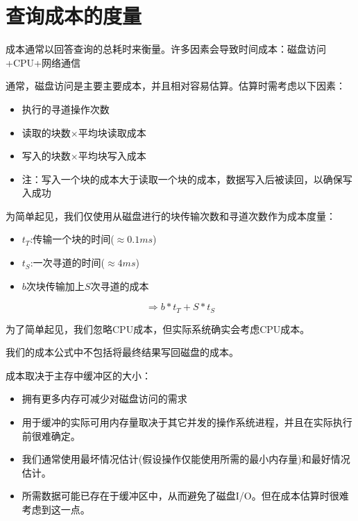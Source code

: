 \section{查询成本的度量}

成本通常以回答查询的总耗时来衡量。许多因素会导致时间成本：磁盘访问+CPU+网络通信

通常，磁盘访问是主要主要成本，并且相对容易估算。估算时需考虑以下因素：

\begin{itemize}
    \item 执行的寻道操作次数
    \item 读取的块数$\times$平均块读取成本
    \item 写入的块数$\times$平均块写入成本
    \item 注：写入一个块的成本大于读取一个块的成本，数据写入后被读回，以确保写入成功
\end{itemize}

为简单起见，我们仅使用从磁盘进行的块传输次数和寻道次数作为成本度量：

\begin{itemize}
    \item $t_T$:传输一个块的时间($\approx 0.1ms$)
    \item $t_S$:一次寻道的时间($\approx 4ms$)
    \item $b$次块传输加上$S$次寻道的成本
\end{itemize}
$$\Longrightarrow b*t_T+S*t_S$$

为了简单起见，我们忽略CPU成本，但实际系统确实会考虑CPU成本。

我们的成本公式中不包括将最终结果写回磁盘的成本。

成本取决于主存中缓冲区的大小：

\begin{itemize}
    \item 拥有更多内存可减少对磁盘访问的需求
    \item 用于缓冲的实际可用内存量取决于其它并发的操作系统进程，并且在实际执行前很难确定。
    \item 我们通常使用最坏情况估计(假设操作仅能使用所需的最小内存量)和最好情况估计。
    \item 所需数据可能已存在于缓冲区中，从而避免了磁盘I/O。但在成本估算时很难考虑到这一点。
\end{itemize}